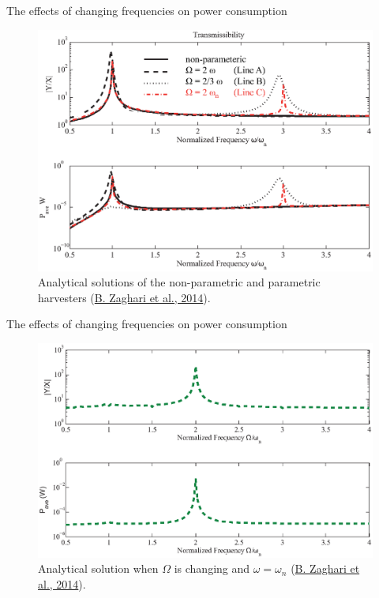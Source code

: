 \documentclass[LaTeX2e,10pt]{beamer}
\begin{document}
\begin{frame}{The effects of changing frequencies on power consumption}
\begin{figure}
\includegraphics[width=\linewidth]{Images/Fig9EuroDyn4.eps}
\caption{Analytical solutions of the non-parametric and parametric harvesters (\href{https://eprints.soton.ac.uk/366807/}{B. Zaghari et al., 2014}).} 
\end{figure}
\end{frame}
\begin{frame}{The effects of changing frequencies on power consumption}
\begin{figure}
\includegraphics[width=\linewidth]{Images/Fig9EuroDyn5.eps}
\caption{Analytical solution when $\Omega$ is changing and $\omega = \omega_n$ (\href{https://eprints.soton.ac.uk/366807/}{B. Zaghari et al., 2014}).} 
\end{figure}
\end{frame}
\end{document}
